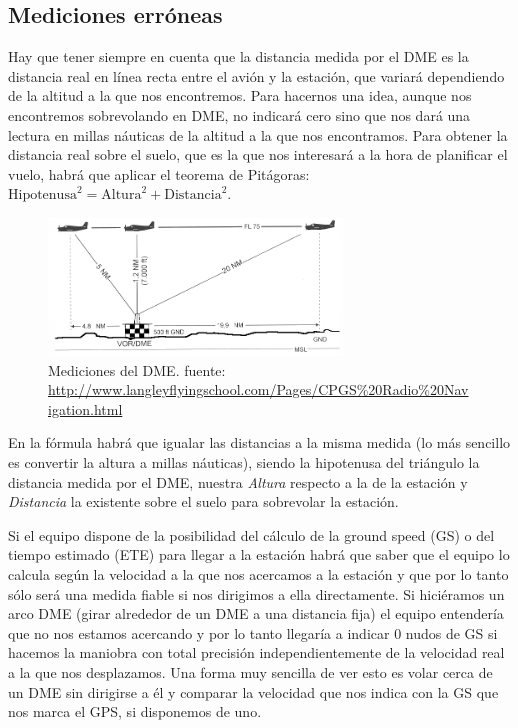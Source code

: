 \subsection{Mediciones err\'oneas}
\label{sec:DME.mediciones.erroneas}

Hay que tener siempre en cuenta que la distancia medida por el DME es la distancia real en l\'inea recta entre el avi\'on y la estaci\'on, que variar\'a dependiendo de la altitud a la que nos encontremos. Para hacernos una idea, aunque nos encontremos sobrevolando en DME, no indicar\'a cero sino que nos dar\'a una lectura en millas n\'auticas de la altitud a la que nos encontramos. Para obtener la distancia real sobre el suelo, que es la que nos interesar\'a a la hora de planificar el vuelo, habr\'a que aplicar el teorema de Pit\'agoras: $\text{Hipotenusa}^2 = \text{Altura}^2+\text{Distancia}^2$.


\begin{figure}[!htb]
  \centering
  \includegraphics[width=0.7\textwidth]{06.radionavegacion/Imagenes/06.04.dme.imagenes/DME_overfly.png}
  \caption{Mediciones del DME. {\tiny fuente: \url{http://www.langleyflyingschool.com/Pages/CPGS\%20Radio\%20Navigation.html
}}
}
  \label{fig:DME.mediciones}
\end{figure}

En la f\'ormula habr\'a que igualar las distancias a la misma medida (lo m\'as sencillo es convertir la altura a millas n\'auticas), siendo la hipotenusa del tri\'angulo la distancia medida por el DME,  nuestra \emph{Altura} respecto a la de la estaci\'on y \emph{Distancia} la existente sobre el suelo para sobrevolar la estaci\'on.

Si el equipo dispone de la posibilidad del c\'alculo de la ground speed (GS) o del tiempo estimado (ETE) para llegar a la estaci\'on habr\'a que saber que el equipo lo calcula seg\'un la velocidad a la que nos acercamos a la estaci\'on y que por lo tanto s\'olo ser\'a una medida fiable si nos dirigimos a ella directamente. Si hici\'eramos un arco DME (girar alrededor de un DME a una distancia fija) el equipo entender\'ia que no nos estamos acercando y por lo tanto llegar\'ia a indicar 0 nudos de GS si hacemos la maniobra con total precisi\'on independientemente de la velocidad real a la que nos desplazamos. Una forma muy sencilla de ver esto es volar cerca de un DME sin dirigirse a \'el y comparar la velocidad que nos indica con la GS que nos marca el GPS, si disponemos de uno.

